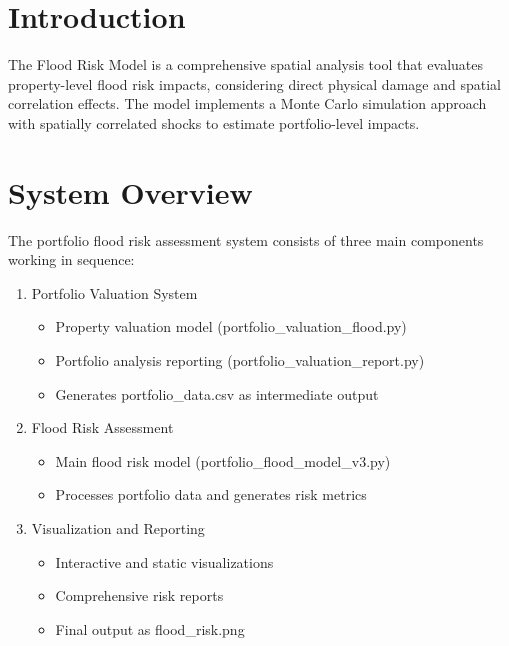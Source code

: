 \documentclass{article}
\begin{document}
\clearpage

\section{Introduction}


The Flood Risk Model is a comprehensive spatial analysis tool that evaluates property-level flood risk impacts, considering direct physical damage and spatial correlation effects. The model implements a Monte Carlo simulation approach with spatially correlated shocks to estimate portfolio-level impacts.


\section{System Overview}

The portfolio flood risk assessment system consists of three main components working in sequence:

\begin{enumerate}
    \item Portfolio Valuation System
    \begin{itemize}
        \item Property valuation model (portfolio\_valuation\_flood.py)
        \item Portfolio analysis reporting (portfolio\_valuation\_report.py)
        \item Generates portfolio\_data.csv as intermediate output
    \end{itemize}
    
    \item Flood Risk Assessment
    \begin{itemize}
        \item Main flood risk model (portfolio\_flood\_model\_v3.py)
        \item Processes portfolio data and generates risk metrics
    \end{itemize}
    
    \item Visualization and Reporting
    \begin{itemize}
        \item Interactive and static visualizations
        \item Comprehensive risk reports
        \item Final output as flood\_risk.png
    \end{itemize}
\end{enumerate}
\end{document}

